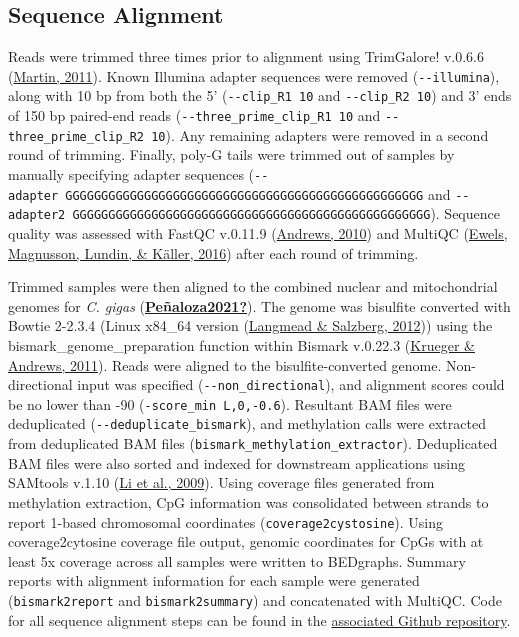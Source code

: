 \documentclass [11pt, proquest] {uwthesis}[2015/03/03]
\begin{document}
\hypertarget{sequence-alignment}{%
\subsection{Sequence Alignment}\label{sequence-alignment}}

Reads were trimmed three times prior to alignment using TrimGalore! v.0.6.6 (\protect\hyperlink{ref-Martin2011}{Martin, 2011}). Known Illumina adapter sequences were removed (\texttt{-\/-illumina}), along with 10 bp from both the 5' (\texttt{-\/-clip\_R1\ 10} and \texttt{-\/-clip\_R2\ 10}) and 3' ends of 150 bp paired-end reads (\texttt{-\/-three\_prime\_clip\_R1\ 10} and \texttt{-\/-three\_prime\_clip\_R2\ 10}). Any remaining adapters were removed in a second round of trimming. Finally, poly-G tails were trimmed out of samples by manually specifying adapter sequences (\texttt{-\/-adapter\ GGGGGGGGGGGGGGGGGGGGGGGGGGGGGGGGGGGGGGGGGGGGGGGGGG} and \texttt{-\/-adapter2\ GGGGGGGGGGGGGGGGGGGGGGGGGGGGGGGGGGGGGGGGGGGGGGGGGG}). Sequence quality was assessed with FastQC v.0.11.9 (\protect\hyperlink{ref-Andrews2010}{Andrews, 2010}) and MultiQC (\protect\hyperlink{ref-Ewels2016}{Ewels, Magnusson, Lundin, \& Käller, 2016}) after each round of trimming.

Trimmed samples were then aligned to the combined nuclear and mitochondrial genomes for \emph{C. gigas} (\protect\hyperlink{ref-Peuxf1aloza2021}{\textbf{Peñaloza2021?}}). The genome was bisulfite converted with Bowtie 2-2.3.4 (Linux x84\_64 version (\protect\hyperlink{ref-Langmead2012}{Langmead \& Salzberg, 2012})) using the bismark\_genome\_preparation function within Bismark v.0.22.3 (\protect\hyperlink{ref-Krueger2011}{Krueger \& Andrews, 2011}). Reads were aligned to the bisulfite-converted genome. Non-directional input was specified (\texttt{-\/-non\_directional}), and alignment scores could be no lower than -90 (\texttt{-score\_min\ L,0,-0.6}). Resultant BAM files were deduplicated (\texttt{-\/-deduplicate\_bismark}), and methylation calls were extracted from deduplicated BAM files (\texttt{bismark\_methylation\_extractor}). Deduplicated BAM files were also sorted and indexed for downstream applications using SAMtools v.1.10 (\protect\hyperlink{ref-Li2009}{Li et al., 2009}). Using coverage files generated from methylation extraction, CpG information was consolidated between strands to report 1-based chromosomal coordinates (\texttt{coverage2cystosine}). Using coverage2cytosine coverage file output, genomic coordinates for CpGs with at least 5x coverage across all samples were written to BEDgraphs. Summary reports with alignment information for each sample were generated (\texttt{bismark2report} and \texttt{bismark2summary}) and concatenated with MultiQC. Code for all sequence alignment steps can be found in the \href{https://github.com/RobertsLab/project-gigas-oa-meth}{associated Github repository}.
\end{document}
